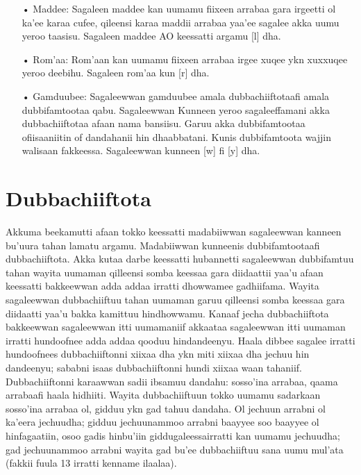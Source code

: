 \documentclass[11pt,b5paper]{book}
\begin{document}
\begin{itemize}
\item[•] Maddee: Sagaleen maddee kan uumamu fiixeen arrabaa gara irgeetti ol ka’ee karaa cufee, qileensi karaa maddii arrabaa yaa’ee sagalee akka uumu yeroo taasisu.  Sagaleen maddee AO keessatti argamu [l] dha. 

\item[•] Rom’aa: Rom’aan kan uumamu fiixeen arrabaa irgee xuqee ykn xuxxuqee yeroo deebihu.  Sagaleen rom’aa kun [r] dha. 

\item[•] Gamduubee: Sagaleewwan gamduubee amala dubbachiiftotaafi amala dubbifamtootaa qabu.  Sagaleewwan Kunneen yeroo sagaleeffamani akka dubbachiiftotaa afaan nama bansiisu.  Garuu akka dubbifamtootaa ofiisaaniitin of dandahanii hin dhaabbatani.  Kunis dubbifamtoota wajjin walisaan fakkeessa.  Sagaleewwan kunneen [w] fi [y] dha. 

\end{itemize}

\section{Dubbachiiftota}

Akkuma beekamutti afaan tokko keessatti madabiiwwan sagaleewwan kanneen bu'uura tahan lamatu argamu.  Madabiiwwan kunneenis dubbifamtootaafi dubbachiiftota.  Akka kutaa darbe keessatti hubannetti sagaleewwan  dubbifamtuu tahan wayita uumaman qilleensi somba keessaa  gara diidaattii yaa'u afaan keessatti bakkeewwan adda addaa  irratti dhowwamee gadhiifama. Wayita sagaleewwan  dubbachiiftuu tahan uumaman garuu qilleensi somba keessaa  gara diidaatti yaa'u bakka kamittuu hindhowwamu. Kanaaf  jecha dubbachiiftota bakkeewwan sagaleewwan itti uumamaniif  akkaataa sagaleewwan itti uumaman irratti hundoofnee adda  addaa qooduu hindandeenyu. Haala dibbee sagalee irratti  hundoofnees dubbachiiftonni xiixaa dha ykn miti xiixaa dha  jechuu hin dandeenyu; sababni isaas dubbachiiftonni hundi  xiixaa waan tahaniif. Dubbachiiftonni karaawwan sadii ibsamuu  dandahu: sosso'ina arrabaa, qaama arrabaafi haala hidhiiti.  Wayita dubbachiiftuun tokko uumamu sadarkaan sosso'ina  arrabaa ol, gidduu ykn gad tahuu dandaha. Ol jechuun arrabni  ol ka'eera jechuudha; gidduu jechuunammoo arrabni baayyee soo baayyee ol hinfagaatiin, osoo gadis hinbu'iin  giddugaleessairratti kan uumamu jechuudha; gad  jechuunammoo arrabni wayita gad bu'ee dubbachiiftuu sana  uumu mul'ata (fakkii fuula 13 irratti kenname ilaalaa). 
\end{document}
